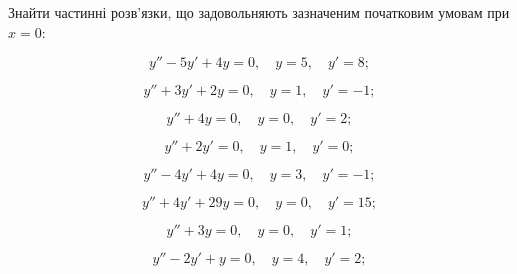 Знайти частинні розв’язки, що задовольняють зазначеним початковим умовам при $x=0$:
\begin{problem}
	\[y''-5y'+4y=0,\quad y=5,\quad y'=8;\]
\end{problem}
\begin{problem}
	\[y''+3y'+2y=0,\quad y=1,\quad y'=-1;\]
\end{problem}
\begin{problem}
	\[y''+4y=0,\quad y=0,\quad y'=2;\]
\end{problem}
\begin{problem}
	\[y''+2y'=0,\quad y=1,\quad y'=0;\]
\end{problem}
\begin{problem}
	\[y''-4y'+4y=0,\quad y=3,\quad y'=-1;\]
\end{problem}
\begin{problem}
	\[y''+4y'+29y=0,\quad y=0,\quad y'=15;\]
\end{problem}
\begin{problem}
	\[y''+3y=0,\quad y=0,\quad y'=1;\]
\end{problem}
\begin{problem}
	\[y''-2y'+y=0,\quad y=4,\quad y'=2;\]
\end{problem}

